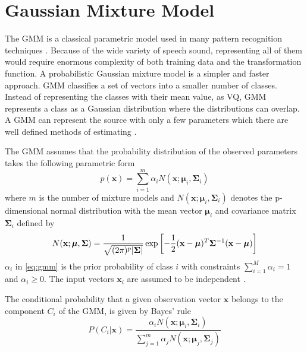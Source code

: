 \section{Gaussian Mixture Model} %
\label{the:gaussian_mixture_model}
The GMM is a classical parametric model used in many pattern recognition techniques \cite{stylianou98}. Because of the wide variety of speech sound, representing all of them would require enormous complexity of both training data and the transformation function. A probabilistic Gaussian mixture model is a simpler and faster approach. GMM classifies a set of vectors into a smaller number of classes. Instead of representing the classes with their mean value, as VQ, GMM represents a class as a Gaussian distribution where the distributions can overlap. A GMM can represent the source with only a few parameters which there are well defined methods of estimating \cite{taletek}.

The GMM assumes that the probability distribution of the observed parameters takes the following parametric form
\begin{equation}
	\label{eq:gmm}
	p(\mathbf{x}) = \sum_{i=1}^{m} \alpha_i N(\mathbf{x}; \boldsymbol{\mu}_i, \mathbf{\Sigma}_i)
\end{equation}
where $m$ is the number of mixture models and $N(\mathbf{x}; \boldsymbol{\mu}_i, \mathbf{\Sigma}_i)$ denotes the p-dimensional normal distribution \cite{statistikk} with the mean vector $\boldsymbol{\mu}_i$ and covariance matrix $\mathbf{\Sigma}_i$ defined by
\begin{equation}
	N(\mathbf{x}; \boldsymbol{\mu}, \mathbf{\Sigma}) = \frac{1}{\sqrt{(2\pi)^p\lvert\mathbf{\Sigma}\rvert}} \exp\left[ -\frac{1}{2} (\mathbf{x} -\boldsymbol{\mu})^T \mathbf{\Sigma}^{-1} (\mathbf{x} -\boldsymbol{\mu})\right]
\end{equation}
$\alpha_i$ in \eqref{eq:gmm} is the prior probability of class $i$ with constraints $\sum_{i=1}^{M}\alpha_i = 1$ and $\alpha_i \geq 0$. The input vectors $\mathbf{x}_i$ are assumed to be independent \cite{stylianou98}.

The conditional probability that a given observation vector $\mathbf{x}$ belongs to the component $C_i$ of the GMM, is given by Bayes' rule \cite{statistikk}
\begin{equation}
	\label{eq:bayes}
	P(C_i\vert \mathbf{x}) = \frac{\alpha_i N(\mathbf{x}; \boldsymbol{\mu}_i, \mathbf{\Sigma}_i)}{\sum_{j=1}^{m}\alpha_j N(\mathbf{x}; \boldsymbol{\mu}_j, \mathbf{\Sigma}_j)}
\end{equation}

